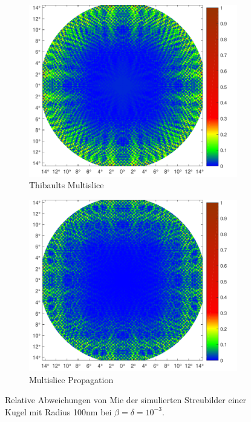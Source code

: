 \begin{figure}
	\begin{subfigure}[b]{0.49\textwidth}
		\includegraphics[width=\textwidth]{images/fig_sim_relerror_thibault-r100-bd1e-3.pdf}
		\caption{Thibaults Multislice}
	\end{subfigure}
	\begin{subfigure}[b]{0.49\textwidth}
		\includegraphics[width=\textwidth]{images/fig_sim_relerror_multislice-r100-bd1e-3.pdf}
		\caption{Multislice Propagation}
	\end{subfigure}
		
	\caption[relativer Fehler der Simulationen]{Relative Abweichungen von Mie der simulierten Streubilder einer Kugel mit Radius 100\si{nm} bei $\beta=\delta=10^{-3}$. }
	\label{fig:relerror}
\end{figure}
